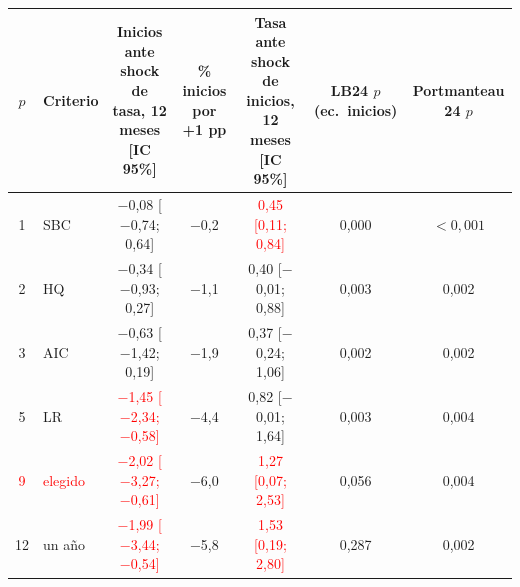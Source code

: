 \begin{tabular}{clccccc}
\toprule
$p$ & Criterio & Inicios ante shock de tasa, 12 meses [IC 95\%] & \% inicios por +1 pp & Tasa ante shock de inicios, 12 meses [IC 95\%] & LB24 $p$ (ec.\ inicios) & Portmanteau 24 $p$
\\ \midrule
1 & SBC & \ensuremath{-}0{,}08 [\ensuremath{-}0{,}74; 0{,}64] & \ensuremath{-}0{,}2 & \textcolor{red}{0{,}45 [0{,}11; 0{,}84]} & 0{,}000 & \ensuremath{<0{,}001} \\
2 & HQ & \ensuremath{-}0{,}34 [\ensuremath{-}0{,}93; 0{,}27] & \ensuremath{-}1{,}1 & 0{,}40 [\ensuremath{-}0{,}01; 0{,}88] & 0{,}003 & 0{,}002 \\
3 & AIC & \ensuremath{-}0{,}63 [\ensuremath{-}1{,}42; 0{,}19] & \ensuremath{-}1{,}9 & 0{,}37 [\ensuremath{-}0{,}24; 1{,}06] & 0{,}002 & 0{,}002 \\
5 & LR & \textcolor{red}{\ensuremath{-}1{,}45 [\ensuremath{-}2{,}34; \ensuremath{-}0{,}58]} & \ensuremath{-}4{,}4 & 0{,}82 [\ensuremath{-}0{,}01; 1{,}64] & 0{,}003 & 0{,}004 \\
\textcolor{red}{9} & \textcolor{red}{elegido} & \textcolor{red}{\ensuremath{-}2{,}02 [\ensuremath{-}3{,}27; \ensuremath{-}0{,}61]} & \ensuremath{-}6{,}0 & \textcolor{red}{1{,}27 [0{,}07; 2{,}53]} & 0{,}056 & 0{,}004 \\
12 & un a\~no & \textcolor{red}{\ensuremath{-}1{,}99 [\ensuremath{-}3{,}44; \ensuremath{-}0{,}54]} & \ensuremath{-}5{,}8 & \textcolor{red}{1{,}53 [0{,}19; 2{,}80]} & 0{,}287 & 0{,}002 \\
\bottomrule
\end{tabular}

